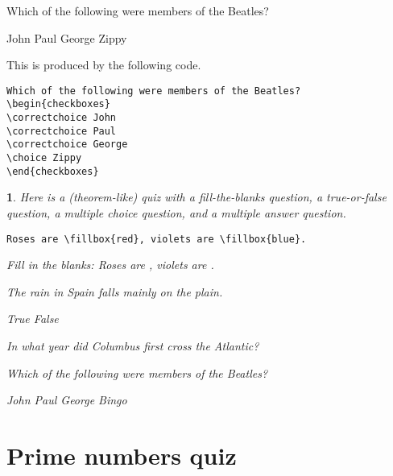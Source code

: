 \documentclass{article}
\newtheorem{quiz}{\quizname}
\begin{document}
Which of the following were members of the Beatles?
\begin{checkboxes}
\correctchoice John
\correctchoice Paul
\correctchoice George
\choice Zippy
\end{checkboxes}

This is produced by the following code.
\begin{Verbatim}[frame=single]
Which of the following were members of the Beatles?
\begin{checkboxes}
\correctchoice John
\correctchoice Paul
\correctchoice George
\choice Zippy
\end{checkboxes}
\end{Verbatim}

\bigskip
\begin{quiz}
Here is a (theorem-like) quiz with a fill-the-blanks question, a true-or-false question, a multiple choice question, and a multiple answer question.

\begin{Verbatim}[frame=single]
Roses are \fillbox{red}, violets are \fillbox{blue}.
\end{Verbatim}

\begin{questions}
\question
Fill in the blanks: {\sl
	Roses are , violets are .
}


\question\label{qu:rain}
The rain in Spain falls mainly on the plain.
\begin{choices}
\correctchoice True 		
\choice False		
\end{choices}

\question\label{qu:america}
In what year did Columbus first cross the Atlantic?
\begin{choices}
\end{choices}

\question\label{qu:beatles}
Which of the following were members of the Beatles?
\begin{checkboxes}
\correctchoice John
\correctchoice Paul
\correctchoice George
\choice Bingo
\end{checkboxes}

\end{questions}
\end{quiz}

\section{Prime numbers quiz}
\end{document}
